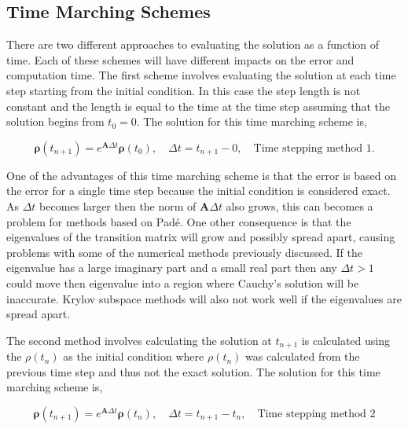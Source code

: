 \subsection{Time Marching Schemes}
\label{sec:timeMarchingSchemes}
There are two different approaches to evaluating the solution as a function of time. Each of these schemes will have different impacts on the error and computation time. The first scheme involves evaluating the solution at each time step starting from the initial condition. In this case the step length is not constant and the length is equal to the time at the time step assuming that the solution begins from $t_{0} = 0$. The solution for this time marching scheme is,

\begin{equation}
    \boldsymbol{\rho}(t_{n+1}) = e^{\boldsymbol{A}\Delta t}\boldsymbol{\rho}(t_{0}), \quad \Delta t = t_{n+1} - 0, \quad \text{Time stepping method 1}.
\end{equation}

\noindent One of the advantages of this time marching scheme is that the error is based on the error for a single time step because the initial condition is considered exact. As $\Delta t$ becomes larger then the norm of $\boldsymbol{A}\Delta t$ also grows, this can becomes a problem for methods based on Pad\'e. One other consequence is that the eigenvalues of the transition matrix will grow and possibly spread apart, causing problems with some of the numerical methods previously discussed. If the eigenvalue has a large imaginary part and a small real part then any $\Delta t > 1$ could move then eigenvalue into a region where Cauchy's solution will be inaccurate. Krylov subspace methods will also not work well if the eigenvalues are spread apart.

The second method involves calculating the solution at $t_{n+1}$ is calculated using the $\rho(t_{n})$ as the initial condition where $\rho(t_{n})$ was calculated from the previous time step and thus not the exact solution. The solution for this time marching scheme is, 

\begin{equation}
    \boldsymbol{\rho}(t_{n+1}) = e^{\boldsymbol{A}\Delta t}\boldsymbol{\rho}(t_{n}), \quad \Delta t = t_{n+1} - t_{n}, \quad \text{Time stepping method 2}
\end{equation}

